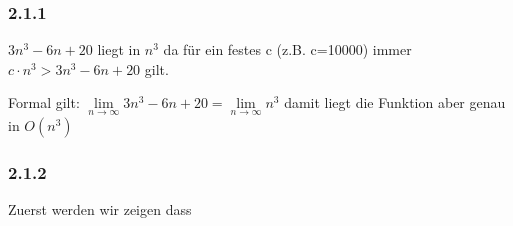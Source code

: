 \subsubsection*{2.1.1}
$3n^3 - 6n + 20$ liegt in $n^3$ da für ein festes c (z.B. c=10000) immer $c \cdot n^3 > 3n^3 - 6n + 20$ gilt.

Formal gilt: $ \lim\limits_{n \to \infty}3n^3-6n+20=\lim\limits_{n \to \infty}n^3 $ damit liegt die Funktion aber genau in $O(n^3)$

\subsubsection*{2.1.2}
Zuerst werden wir zeigen dass
